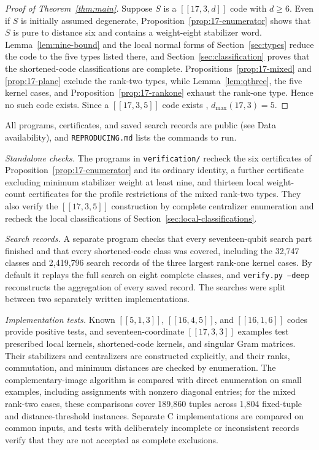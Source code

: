\documentclass[11pt]{article}
\theoremstyle{definition}
\theoremstyle{remark}
\newcommand{\qc}[1]{[\![#1]\!]}
\newcommand{\pathcode}[1]{{\small\nolinkurl{#1}}}
\begin{document}
\begin{proof}[Proof of Theorem~\ref{thm:main}]
Suppose \(S\) is a \(\qc{17,3,d}\) code with \(d\geq6\). Even if \(S\)
is initially assumed degenerate, Proposition~\ref{prop:17-enumerator}
shows that \(S\) is pure to distance six and contains a weight-eight
stabilizer word. Lemma~\ref{lem:nine-bound} and the local normal forms
of Section~\ref{sec:types} reduce the code to the five types listed
there, and Section~\ref{sec:classification} proves that the
shortened-code classifications are complete.
Propositions~\ref{prop:17-mixed} and \ref{prop:17-plane} exclude the
rank-two types, while Lemma~\ref{lem:qthree}, the five kernel cases, and
Proposition~\ref{prop:17-rankone} exhaust the rank-one type. Hence no
such code exists. Since a \(\qc{17,3,5}\) code exists \cite{grassl},
\(d_{\max}(17,3)=5\).
\end{proof}

All programs, certificates, and saved search records are public (see
Data availability), and \pathcode{REPRODUCING.md} lists the commands to
run.

\emph{Standalone checks.} The programs in \pathcode{verification/}
recheck the six certificates of Proposition~\ref{prop:17-enumerator} and
its ordinary identity, a further certificate excluding minimum
stabilizer weight at least nine, and thirteen local weight-count
certificates for the profile restrictions of the mixed rank-two types.
They also verify the \(\qc{17,3,5}\) construction by complete
centralizer enumeration and recheck the local classifications of
Section~\ref{sec:local-classifications}.

\emph{Search records.} A separate program checks that every
seventeen-qubit search part finished and that every shortened-code class
was covered, including the 32,747 classes and 2,419,796 search records
of the three largest rank-one kernel cases. By default it replays the
full search on eight complete classes, and
{\small\texttt{verify.py --{}deep}} reconstructs the aggregation of
every saved record. The searches were split between two separately
written implementations.

\emph{Implementation tests.} Known \(\qc{5,1,3}\), \(\qc{16,4,5}\), and
\(\qc{16,1,6}\) codes provide positive tests, and seventeen-coordinate
\(\qc{17,3,3}\) examples test prescribed local kernels, shortened-code
kernels, and singular Gram matrices. Their stabilizers and centralizers
are constructed explicitly, and their ranks, commutation, and minimum
distances are checked by enumeration. The complementary-image algorithm
is compared with direct enumeration on small examples, including
assignments with nonzero diagonal entries; for the mixed rank-two cases,
these comparisons cover 189,860 tuples across 1,804 fixed-tuple and
distance-threshold instances. Separate C implementations are compared on
common inputs, and tests with deliberately incomplete or inconsistent
records verify that they are not accepted as complete exclusions.
\end{document}

